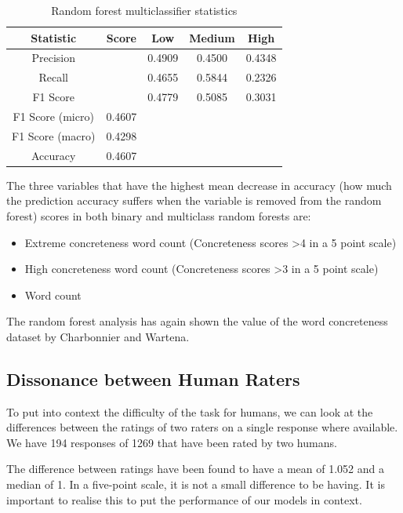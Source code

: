 \documentclass[12pt, a4paper]{article}
\begin{document}
\begin{table}[t!]
\centering
\begin{tabular}{||c c c c c||} 
 \hline
 Statistic & Score & Low & Medium & High  \\ [0.5ex] 
 \hline\hline
 Precision &  & 0.4909 & 0.4500 & 0.4348 \\ 
 Recall & & 0.4655 & 0.5844  & 0.2326 \\
 F1 Score &  & 0.4779 & 0.5085  & 0.3031\\
 F1 Score (micro) & 0.4607 & & & \\
 F1 Score (macro)  & 0.4298 & & & \\ 
 Accuracy  & 0.4607 & & & \\ [1ex] 
 \hline
\end{tabular}

\caption{Random forest multiclassifier statistics}
\label{table:rfstat}
\end{table}

The three variables that have the highest mean decrease in accuracy (how much the prediction accuracy suffers when the variable is removed from the random forest) scores in both binary and multiclass random forests are: 
\begin{itemize}
  \item Extreme concreteness word count (Concreteness scores >4 in a 5 point scale)
  \item High concreteness word count (Concreteness scores >3 in a 5 point scale)
  \item Word count
\end{itemize}

The random forest analysis has again shown the value of the word concreteness dataset by Charbonnier and Wartena\cite{charbonnier-wartena-2019-predicting}.

\subsection{Dissonance between Human Raters}
To put into context the difficulty of the task for humans, we can look at the differences between the ratings of two raters on a single response where available. We have 194 responses of 1269 that have been rated by two humans. 

The difference between ratings have been found to have a mean of 1.052 and a median of 1. In a five-point scale, it is not a small difference to be having. It is important to realise this to put the performance of our models in context.
\end{document}
